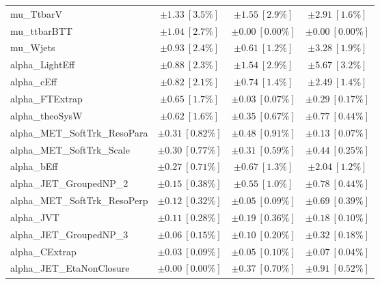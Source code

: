 \begin{table}
\begin{center}
\begin{tabular*}{\textwidth}{@{\extracolsep{\fill}}lccc}
mu\_TtbarV         & $\pm 1.33\ [3.5\%] $          & $\pm 1.55\ [2.9\%] $          & $\pm 2.91\ [1.6\%] $       \\
mu\_ttbarBTT         & $\pm 1.04\ [2.7\%] $          & $\pm 0.00\ [0.00\%] $          & $\pm 0.00\ [0.00\%] $       \\
mu\_Wjets         & $\pm 0.93\ [2.4\%] $          & $\pm 0.61\ [1.2\%] $          & $\pm 3.28\ [1.9\%] $       \\
alpha\_LightEff         & $\pm 0.88\ [2.3\%] $          & $\pm 1.54\ [2.9\%] $          & $\pm 5.67\ [3.2\%] $       \\
alpha\_cEff         & $\pm 0.82\ [2.1\%] $          & $\pm 0.74\ [1.4\%] $          & $\pm 2.49\ [1.4\%] $       \\
alpha\_FTExtrap         & $\pm 0.65\ [1.7\%] $          & $\pm 0.03\ [0.07\%] $          & $\pm 0.29\ [0.17\%] $       \\
alpha\_theoSysW         & $\pm 0.62\ [1.6\%] $          & $\pm 0.35\ [0.67\%] $          & $\pm 0.77\ [0.44\%] $       \\
alpha\_MET\_SoftTrk\_ResoPara         & $\pm 0.31\ [0.82\%] $          & $\pm 0.48\ [0.91\%] $          & $\pm 0.13\ [0.07\%] $       \\
alpha\_MET\_SoftTrk\_Scale         & $\pm 0.30\ [0.77\%] $          & $\pm 0.31\ [0.59\%] $          & $\pm 0.44\ [0.25\%] $       \\
alpha\_bEff         & $\pm 0.27\ [0.71\%] $          & $\pm 0.67\ [1.3\%] $          & $\pm 2.04\ [1.2\%] $       \\
alpha\_JET\_GroupedNP\_2         & $\pm 0.15\ [0.38\%] $          & $\pm 0.55\ [1.0\%] $          & $\pm 0.78\ [0.44\%] $       \\
alpha\_MET\_SoftTrk\_ResoPerp         & $\pm 0.12\ [0.32\%] $          & $\pm 0.05\ [0.09\%] $          & $\pm 0.69\ [0.39\%] $       \\
alpha\_JVT         & $\pm 0.11\ [0.28\%] $          & $\pm 0.19\ [0.36\%] $          & $\pm 0.18\ [0.10\%] $       \\
alpha\_JET\_GroupedNP\_3         & $\pm 0.06\ [0.15\%] $          & $\pm 0.10\ [0.20\%] $          & $\pm 0.32\ [0.18\%] $       \\
alpha\_CExtrap         & $\pm 0.03\ [0.09\%] $          & $\pm 0.05\ [0.10\%] $          & $\pm 0.07\ [0.04\%] $       \\
alpha\_JET\_EtaNonClosure         & $\pm 0.00\ [0.00\%] $          & $\pm 0.37\ [0.70\%] $          & $\pm 0.91\ [0.52\%] $       \\

\end{tabular*}
\end{center}
\end{table}
